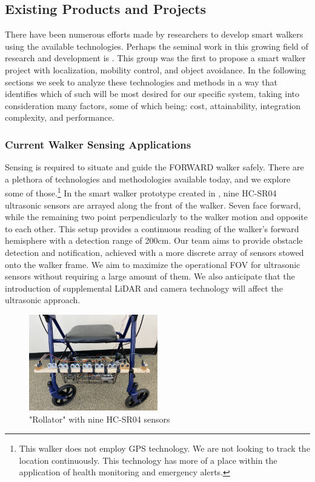 \subsection{Existing Products and Projects}

\noindent There have been numerous efforts made by researchers to develop smart walkers using the available technologies. Perhaps the seminal work in this growing field of research and development is \cite{PAMM}. This group was the first to propose a smart walker project with localization, mobility control, and object avoidance. In the following sections we seek to analyze these technologies and methods in a way that identifies which of such will be most desired for our specific system, taking into consideration many factors, some of which being: cost, attainability, integration complexity, and performance.

\subsubsection{Current Walker Sensing Applications}
\noindent Sensing is required to situate and guide the FORWARD walker safely. There are a plethora of technologies and methodologies available today, and we explore some of those.\footnote{\noindent This walker does not employ GPS technology. We are not looking to track the location continuously. This technology has more of a place within the application of health monitoring and emergency alerts.} In the smart walker prototype created in \cite{Mostofa}, nine HC-SR04 ultrasonic sensors are arrayed along the front of the walker. Seven face forward, while the remaining two point perpendicularly to the walker motion and opposite to each other. This setup provides a continuous reading of the walker's forward hemisphere with a detection range of 200cm. Our team aims to provide obstacle detection and notification, achieved with a more discrete array of sensors stowed onto the walker frame. We aim to maximize the operational FOV for ultrasonic sensors without requiring a large amount of them. We also anticipate that the introduction of supplemental LiDAR and camera technology will affect the ultrasonic approach.\\

\begin{figure}[H]
	\centering
	\includegraphics[width=0.5\textwidth]{./Images/mostafa9.png}
	\caption{\label{fig:mostafa9}"Rollator" with nine HC-SR04 sensors \cite{Mostofa}}
\end{figure}

